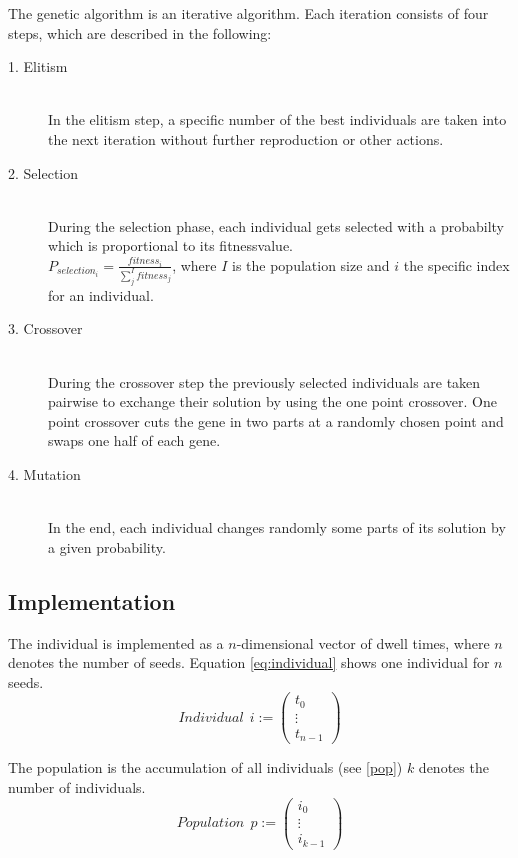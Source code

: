 \documentclass[12pt]{article}
\begin{document}
The genetic algorithm is an iterative algorithm. Each iteration consists of four steps, which are described in the following:

\begin{description}
\item[1. Elitism]~\\
In the elitism step, a specific number of the best individuals are taken into the next iteration without further reproduction or other actions. 
\item[2. Selection]~\\
During the selection phase, each individual gets selected with a probabilty which is proportional to its fitnessvalue.\\
$P_{selection_{i}}= \tfrac{fitness_{i}}{\sum_{j}^I fitness_{j}}$, where $I$ is the population size and $i$ the specific index for an individual.
\item[3. Crossover]~\\
During the crossover step the previously selected individuals are taken pairwise to exchange their solution by using the one point crossover. One point crossover cuts the gene in two parts at a randomly chosen point and swaps one half of each gene.



\item[4. Mutation]~\\
In the end, each individual changes randomly some parts of its solution by a given probability.
\end{description}

\subsection{Implementation}
\label{subsec:impl}

The individual is implemented as a $n$-dimensional vector of dwell times, where $n$ denotes the number of seeds. Equation \eqref{eq:individual} shows one individual for $n $ seeds.
 \begin{equation}
 \label{eq:individual}
 Individual \ \ i := \begin{pmatrix}
 t_{0} \\ \vdots \\ t_{n-1} 	
\end{pmatrix}   
\end{equation} 
 
 The population is the accumulation of all individuals (see \ref{pop}) $k$ denotes the number of individuals.
\begin{equation}
 \label{eq:population}
 Population \ \ p := \begin{pmatrix}
 i_{0} \\ \vdots \\ i_{k-1} 	
\end{pmatrix}   
 \end{equation}
 
\end{document}
